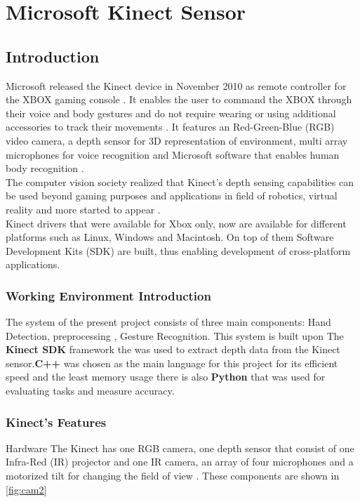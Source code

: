 

\chapter{Microsoft  Kinect Sensor}

\section{Introduction}\label{sec:kinect}

Microsoft released the Kinect device in November 2010 as remote controller for the XBOX gaming console \cite{kinect1}. 
It enables the user to command the XBOX through their voice and body gestures and do not require wearing or using additional accessories to track their movements \cite{kinect1}.
 It features an Red-Green-Blue (RGB) video camera, a depth sensor for 3D representation of environment, multi array microphones for voice recognition and Microsoft software that enables human body recognition \cite{kinect1}. \\
The computer vision society realized that Kinect’s depth sensing capabilities can be used beyond gaming purposes and applications in field of robotics, virtual reality and more started to appear \cite{kinect15}. \\
Kinect drivers that were available for Xbox only, now are available for different platforms such as Linux, Windows and Macintosh. 
On top of them Software Development Kits (SDK) are built, thus enabling development of cross-platform applications.

\subsection{Working  Environment  Introduction }
The system of the present project  consists of three main components:  Hand Detection, preprocessing ,  Gesture Recognition.  This system is built upon  The \textbf{Kinect SDK}  framework the was  used to extract  depth data  from the Kinect sensor.\textbf{C++} was chosen as the main language for this project for its efficient speed and the least memory usage  there is also \textbf{Python} that was used for  evaluating tasks and measure accuracy.


\subsection{Kinect's Features }

Hardware The Kinect has one RGB camera, one depth sensor that consist of one Infra-Red (IR) projector and one IR camera, an array of four microphones and a motorized tilt for changing the field of view \cite{kinect15}. These components are shown in \ref{fig:cam2}

